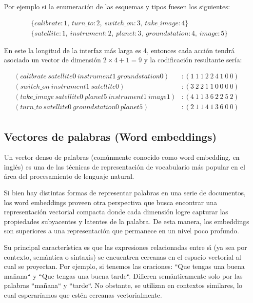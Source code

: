 Por ejemplo si la enumeración de las esquemas y tipos fuesen los siguientes:

\begin{align*}
    &\{calibrate: 1,\ turn\_to: 2,\ switch\_on:3,\ take\_image:4 \} \\
    &\{satellite: 1,\ instrument: 2,\ planet: 3,\ groundstation: 4,\ image: 5\}
\end{align*}

En este la longitud de la interfaz más larga es 4, entonces cada acción tendrá
asociado un vector de dimensión $2 \times 4 + 1 = 9$ y la codificación
resultante sería:

\begin{align*}
    (calibrate\ satellite0\ instrument1\ groundstation0) &: (1\ 1\ 1\ 2\ 2\ 4\ 1\ 0\ 0) \\
    (switch\_on\ instrument1\ satellite0) &: (3\ 2\ 2\ 1\ 1\ 0\ 0\ 0\ 0) \\
    (take\_image\ satellite0\ planet5\ instrument1\ image1) &: (4\ 1\ 1\ 3\ 6\ 2\ 2\ 5\ 2) \\
    (turn\_to\ satellite0\ groundstation0\ planet5) &: (2\ 1\ 1\ 4\ 1\ 3\ 6\ 0\ 0) \\
\end{align*}

\subsection{Vectores de palabras (Word embeddings)}

Un vector denso de palabras (comúnmente conocido como word embedding, en inglés)
es una de las técnicas de representación de vocabulario más popular en el área
del procesamiento de lenguaje natural.

Si bien hay distintas formas de representar palabras en una serie de documentos,
los word embeddings proveen otra perspectiva que busca encontrar una
representación vectorial compacta donde cada dimensión logre capturar las
propiedades subyacentes y latentes de la palabra. De esta manera, los embeddings
son superiores a una representación que permanece en un nivel poco profundo.

Su principal característica  es que las expresiones relacionadas entre sı́ (ya
sea por contexto, semántica o sintaxis) se encuentren cercanas en el espacio
vectorial al cual se proyectan. Por ejemplo, si tenemos las oraciones: ``Que
tengas una buena mañana`` y ``Que tengas una buena tarde``. Difieren
semánticamente solo por las palabras ``mañana`` y ``tarde``. No obstante, se
utilizan en contextos similares, lo cual esperaríamos que estén cercanas
vectorialmente.

